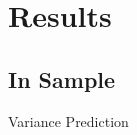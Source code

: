\documentclass{beamer}
\begin{document}
%
%
%				


\section{Results}
\subsection{In Sample}

\begin{frame}{Variance Prediction}
	\vspace{-12pt}
 \begin{table}
 	\begin{adjustbox}{width=\textwidth,height=4cm}
 	
 	\end{adjustbox}

 \end{table}
\end{frame}

%			
%		
\end{document}
